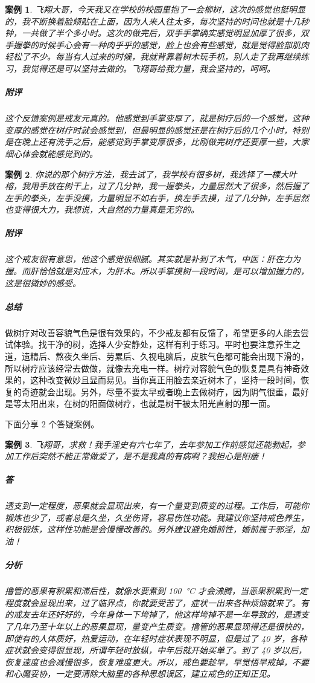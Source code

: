 \documentclass[fontset=founder]{ctexart}
\newtheorem{case}{案例}
\begin{document}
\begin{case}
    飞翔大哥，今天我又在学校的校园里抱了一会柳树，这次的感觉也挺明显的，我不断换着脸颊贴在上面，因为人来人往太多，每次坚持的时间也就是十几秒钟，一共做了半个多小时。这次的做完后，双手手掌确实感觉明显加厚了很多，双手握拳的时候手心会有一种肉乎乎的感觉，脸上也会有些感觉，就是觉得脸部肌肉轻松了不少。每当有人过来的时候，我就背靠着树木玩手机，别人走了我再继续练习，我觉得还是可以坚持去做的。飞翔哥给我力量，我会坚持的，呵呵。

    \subparagraph{附评} 这个反馈案例是戒友元真的。他感觉到手掌变厚了，就是树疗后的一个感觉，这种变厚的感觉在树疗时就会感觉到，但最明显的感觉还是在树疗后的几个小时，特别是在晚上还有洗手之后，能感觉到手掌变厚很多，比刚做完树疗还要厚一些，大家细心体会就能感觉到的。
\end{case}

\begin{case}
    你说的那个树疗方法，我去试了，我学校有很多树，我选择了一棵大叶榕，我用手放在树干上，过了几分钟，我一握拳头，力量居然大了很多，然后握了左手的拳头，左手没摸，力量明显不如右手，换左手去摸，过了几分钟，左手居然也变得很大力，我想说，大自然的力量真是无穷的。

    \subparagraph{附评} 这个戒友很有意思，他这个感觉很细腻。其实就是补到了木气，中医：肝在力为握。而肝恰恰就是对应木，为肝木。所以手掌摸树一段时间，是可以增加握力的，这是很微妙的感受。
\end{case}

\subparagraph{总结} 做树疗对改善容貌气色是很有效果的，不少戒友都有反馈了，希望更多的人能去尝试体验。找干净的树，选择人少安静处，这样有利于练习。平时也要注意养生之道，遗精后、熬夜久坐后、劳累后、久视电脑后，皮肤气色都可能会出现下滑的，所以树疗应该经常去做做，就像去充电一样。树疗对容貌气色的恢复是具有神奇效果的，这种改变微妙且显而易见。当你真正用脸去亲近树木了，坚持一段时间，恢复的奇迹就会出现。另外，尽量不要太早或者晚上去做树疗，因为阴气很重，最好是等太阳出来，在树的阳面做树疗，也就是树干被太阳光直射的那一面。

下面分享 2 个答疑案例。

\begin{case}
    飞翔哥，求救！我手淫史有六七年了，去年参加工作前感觉还能勃起，参加工作后突然不能正常做爱了，是不是我真的有病啊？我担心是阳痿！
    \subparagraph{答} 透支到一定程度，恶果就会显现出来，有一个量变到质变的过程。工作后，可能你锻炼也少了，或者总是久坐，久坐伤肾，容易伤性功能。我建议你坚持戒色养生，积极锻炼，这样性功能是会慢慢改善的。另外建议避免婚前性，婚前属于邪淫，加油！
    \subparagraph{分析} 撸管的恶果有积累和滞后性，就像水要煮到 \SI{100}{\degreeCelsius} 才会沸腾，当恶果积累到一定程度就会显现出来，过了临界点，你就要受苦了，症状一出来各种烦恼就来了。有的戒友去年还好好的，今年身体一下垮掉了，他这样垮掉不是一年导致的，是透支了几年乃至十年以上的恶果显现，量变产生质变。撸管的恶果显现得还是很快的，即使有的人体质好，热爱运动，在年轻时症状表现不明显，但是过了 40 岁，各种症状就会变得很显现，所谓年轻时放纵，中年后就开始买单了。到了 40 岁以后，恢复速度也会减慢很多，恢复难度更大。所以，戒色要趁早，早觉悟早戒掉，不要和心魔妥协，一定要清除大脑里的各种思想误区，建立戒色的正知正见。
\end{case}
\end{document}
